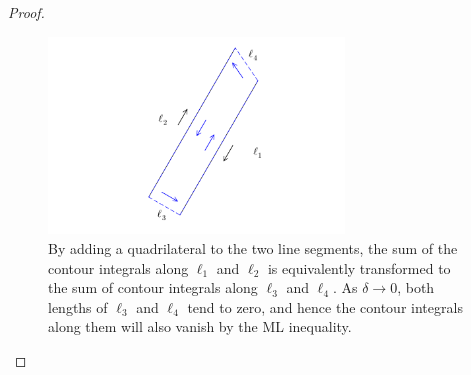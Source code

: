 \documentclass[thmcnt=section, color=cyan, 12pt]{my-elegantbook}
\begin{document}
\begin{proof}
	\begin{figure}[H]
		\centering
		\includegraphics[width=0.7\textwidth]{figures/adding-a-quadrilateral-to-two-line-segments.png}
		\caption{By adding a quadrilateral to the two line segments, the sum of the contour integrals along $\ell_1$ and $\ell_2$ is equivalently transformed to the sum of contour integrals along $\ell_3$ and $\ell_4$. As $\delta \to 0$, both lengths of $\ell_3$ and $\ell_4$ tend to zero, and hence the contour integrals along them will also vanish
			by the ML inequality.}
		\label{fig:3}
	\end{figure}


\end{proof}
\end{document}
